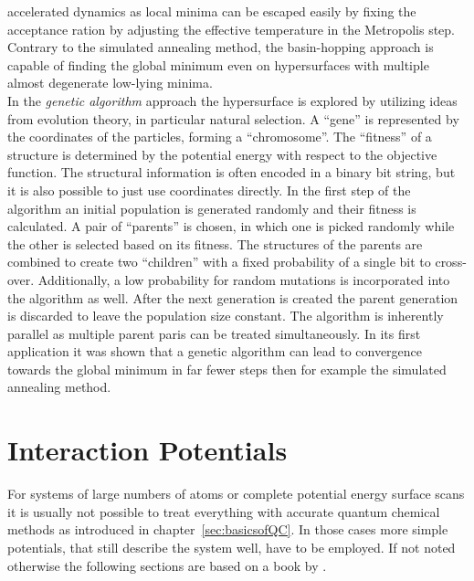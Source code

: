 accelerated dynamics as local minima can be escaped easily by fixing the
acceptance ration by adjusting the effective temperature in the Metropolis step.
Contrary to the simulated annealing method, the basin-hopping approach is
capable of finding the global minimum even on hypersurfaces with multiple almost
degenerate low-lying minima.
%
\\\newline
In the \textit{genetic algorithm}
approach\autocite{Goldberg_GeneticAlgorithmsSearch_1989} the hypersurface is
explored by utilizing ideas from evolution theory, in particular natural
selection. A ``gene'' is represented by the coordinates of the particles,
forming a ``chromosome''. The ``fitness'' of a structure is determined by the
potential energy with respect to the objective function. The structural
information is often encoded in a binary bit string, but it is also possible to
just use coordinates directly. In the first step of the algorithm an initial
population is generated randomly and their fitness is calculated. A pair of
``parents'' is chosen, in which one is picked randomly while the other is
selected based on its fitness. The structures of the parents are combined to
create two ``children'' with a fixed probability of a single bit to cross-over.
Additionally, a low probability for random mutations is incorporated into the
algorithm as well. After the next generation is created the parent generation is
discarded to leave the population size constant. The algorithm is inherently
parallel as multiple parent paris can be treated simultaneously. In its first
application it was shown that a genetic algorithm can lead to convergence
towards the global minimum in far fewer steps then for example the simulated
annealing method.\autocite{Hartke_Globalgeometryoptimization_1993}



\chapter{Interaction Potentials}
\label{sec:energylandscapes}

For systems of large numbers of atoms or complete potential energy surface
scans it is usually not possible to treat everything with accurate quantum
chemical methods as introduced in chapter~\ref{sec:basicsofQC}. In those cases
more simple potentials, that still describe the system well, have to be
employed. If not noted otherwise the following sections are based on a book by
\citeauthor{Hirschfelder_Moleculartheorygases_1964}.\autocite{Hirschfelder_Moleculartheorygases_1964} 

